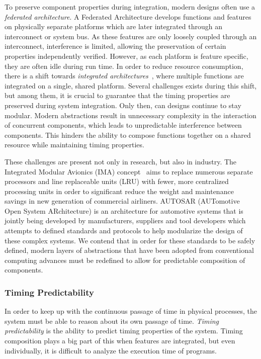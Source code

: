 To preserve component properties during integration, modern designs often use a \textit{federated architecture}.
A Federated Architecture develops functions and features on physically separate platforms which are later integrated through an interconnect or system bus. 
As these features are only loosely coupled through an interconnect, interference is limited, allowing the preservation of certain properties independently verified. 
However, as each platform is feature specific, they are often idle during run time.
In order to reduce resource consumption, there is a shift towards \textit{integrated architectures}~\cite{Obermaisser2009FedtoIMA,AvionicsWatkins2007IMA}, where multiple functions are integrated on a single, shared platform.
Several challenges exists during this shift, but among them, it is crucial to guarantee that the timing properties are preserved during system integration.
Only then, can designs continue to stay modular. 
Modern abstractions result in unnecessary complexity in the interaction of concurrent components, which leads to unpredictable interference between components. 
This hinders the ability to compose functions together on a shared resource while maintaining timing properties. 

These challenges are present not only in research, but also in industry.  
The Integrated Modular Avionics (IMA) concept~ aims to replace numerous separate processors and line replaceable units (LRU) with fewer, more centralized processing units in order to significant reduce the weight and maintenance savings in new generation of commercial airliners.
AUTOSAR (AUTomotive Open System ARchitecture)\cite{autosarsite} is an architecture for automotive systems that is jointly being developed by manufacturers, suppliers and tool developers which attempts to defined standards and protocols to help modularize the design of these complex systems.
We contend that in order for these standards to be safely defined, modern layers of abstractions that have been adopted from conventional computing advances must be redefined to allow for  predictable composition of components.  

\subsubsection{Timing Predictability}
In order to keep up with the continuous passage of time in physical processes, the system must be able to reason about its own passage of time.
\textit{Timing predictability} is the ability to predict timing properties of the system.
Timing composition plays a big part of this when features are integrated, but even individually, it is difficult to analyze the execution time of programs.


